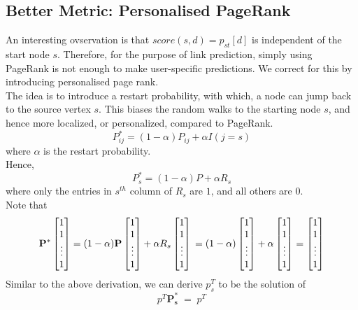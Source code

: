 \documentclass{article}
\begin{document}
\subsection{Better Metric: Personalised PageRank}
An interesting ovservation is that $score(s,d) = p_{st}[d]$ is independent of the start node $s$. Therefore, for the purpose of link prediction, simply using PageRank is not enough to make user-specific predictions. We correct for this by introducing personalised page rank.\\
The idea is to introduce a restart probability, with which, a node can jump back to the source vertex $s$. This biases the random walks to the starting node $s$, and hence more localized, or personalized, compared to PageRank.  
\begin{equation*}
    P^*_{ij} = (1-\alpha)P_{ij} + \alpha I(j=s)
\end{equation*}
where $\alpha$ is the restart probability.\\
Hence, 
\begin{equation*}
    P^*_{s} = (1-\alpha)P + \alpha R_s
\end{equation*}
where only the entries in $s^{th}$ column of $R_s$ are $1$, and all others are $0$. 
\\Note that
\begin{equation*}
    \mathbf{P^*}
    \begin{bmatrix}
    1 \\ 1 \\ \vdots \\ 1
    \end{bmatrix} = 
    (1-\alpha)\mathbf{P}
    \begin{bmatrix}
    1 \\ 1 \\ \vdots \\ 1
    \end{bmatrix} + \alpha R_s \begin{bmatrix}
    1 \\ 1 \\ \vdots \\ 1
    \end{bmatrix} 
    \\= 
    (1-\alpha)
    \begin{bmatrix}
    1 \\ 1 \\ \vdots \\ 1
    \end{bmatrix} + \alpha \begin{bmatrix}
    1 \\ 1 \\ \vdots \\ 1
    \end{bmatrix} 
    = 
    \begin{bmatrix}
    1 \\ 1 \\ \vdots \\ 1
    \end{bmatrix}
\end{equation*}
Similar to the above derivation, we can derive $p^T_s$ to be the solution of 
\begin{equation*}
    p^T \mathbf{P^*_s} \; = \; p^T
\end{equation*}
\end{document}
